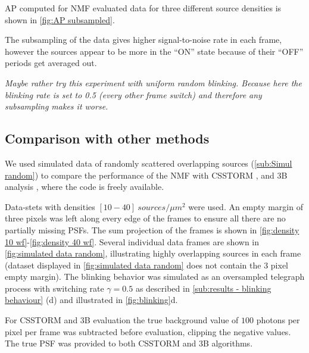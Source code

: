 AP computed for NMF evaluated data for three different source densities is shown in \autoref{fig:AP subsampled}. 

The subsampling of the data gives higher signal-to-noise rate in each frame, however the sources appear to be more in the ``ON'' state because of their ``OFF'' periods get averaged out. 

\emph{Maybe rather try this experiment with uniform random blinking. Because here the blinking rate is set to 0.5 (every other frame switch) and therefore any subsampling makes it worse.}

\clearpage
\subsection{Comparison with other methods\label{sub:results - comparison}} %
We used simulated data of randomly scattered overlapping sources (\autoref{sub:Simul random}) to compare the performance of the NMF with CSSTORM \cite{Zhu2012}, and 3B analysis \cite{Cox2011}, where the code is freely available. 

Data-stets with densities $[10 - 40]\ \unit{sources/\mu m^{2}}$ were used. An empty margin of three pixels was left along every edge of the frames to ensure all there are no partially missing PSFs. The sum projection of the frames is shown in \autoref{fig:density 10 wf}-\ref{fig:density 40 wf}. Several individual data frames are shown in \autoref{fig:simulated data random}, illustrating highly overlapping sources in each frame (dataset displayed in \autoref{fig:simulated data random} does not contain the 3 pixel empty margin). The blinking behavior was simulated as an oversampled telegraph process with switching rate $\gamma=0.5$ as described in \autoref{sub:results - blinking behaviour} (d) and illustrated in \autoref{fig:blinking}d.

For CSSTORM and 3B evaluation the true background value of $100$ photons per pixel per frame was subtracted before evaluation, clipping the negative values. The true PSF was provided to both CSSTORM and 3B algorithms. 

